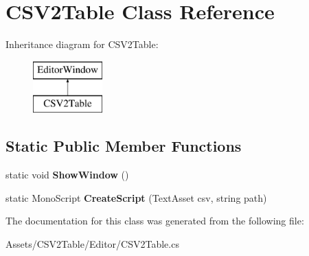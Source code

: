 \hypertarget{class_c_s_v2_table}{}\section{C\+S\+V2\+Table Class Reference}
\label{class_c_s_v2_table}
Inheritance diagram for C\+S\+V2\+Table\+:\begin{figure}[H]
\begin{center}
\leavevmode
\includegraphics[height=2.000000cm]{class_c_s_v2_table}
\end{center}
\end{figure}
\subsection*{Static Public Member Functions}
\begin{DoxyCompactItemize}
\item 
static void {\bfseries Show\+Window} ()\hypertarget{class_c_s_v2_table_a32d34cbf4e9048a9b7f87287109ba28f}{}\label{class_c_s_v2_table_a32d34cbf4e9048a9b7f87287109ba28f}

\item 
static Mono\+Script {\bfseries Create\+Script} (Text\+Asset csv, string path)\hypertarget{class_c_s_v2_table_a00c4c10a57c8f1b1dc0f5349f7e9143f}{}\label{class_c_s_v2_table_a00c4c10a57c8f1b1dc0f5349f7e9143f}

\end{DoxyCompactItemize}


The documentation for this class was generated from the following file\+:\begin{DoxyCompactItemize}
\item 
Assets/\+C\+S\+V2\+Table/\+Editor/C\+S\+V2\+Table.\+cs\end{DoxyCompactItemize}
